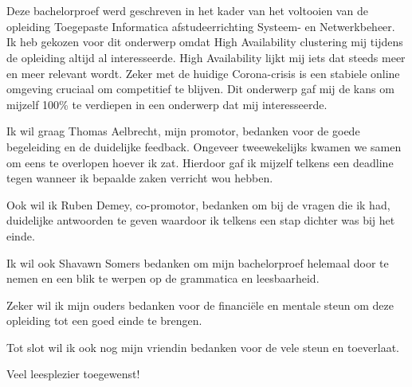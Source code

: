 
\chapter*{}
\label{ch:voorwoord}

Deze bachelorproef werd geschreven in het kader van het voltooien van de opleiding Toegepaste Informatica afstudeerrichting Systeem- en Netwerkbeheer. Ik heb gekozen voor dit onderwerp omdat High Availability clustering mij tijdens de opleiding altijd al interesseerde. High Availability lijkt mij iets dat steeds meer en meer relevant wordt. Zeker met de huidige Corona-crisis is een stabiele online omgeving cruciaal om competitief te blijven. Dit onderwerp gaf mij de kans om mijzelf 100\% te verdiepen in een onderwerp dat mij interesseerde.

Ik wil graag Thomas Aelbrecht, mijn promotor, bedanken voor de goede begeleiding en de duidelijke feedback. Ongeveer tweewekelijks kwamen we samen om eens te overlopen hoever ik zat. Hierdoor gaf ik mijzelf telkens een deadline tegen wanneer ik bepaalde zaken verricht wou hebben.

Ook wil ik Ruben Demey, co-promotor, bedanken om bij de vragen die ik had, duidelijke antwoorden te geven waardoor ik telkens een stap dichter was bij het einde.

Ik wil ook Shavawn Somers bedanken om mijn bachelorproef helemaal door te nemen en een blik te werpen op de grammatica en leesbaarheid.

Zeker wil ik mijn ouders bedanken voor de financiële en mentale steun om deze opleiding tot een goed einde te brengen.

Tot slot wil ik ook nog mijn vriendin bedanken voor de vele steun en toeverlaat.

Veel leesplezier toegewenst!